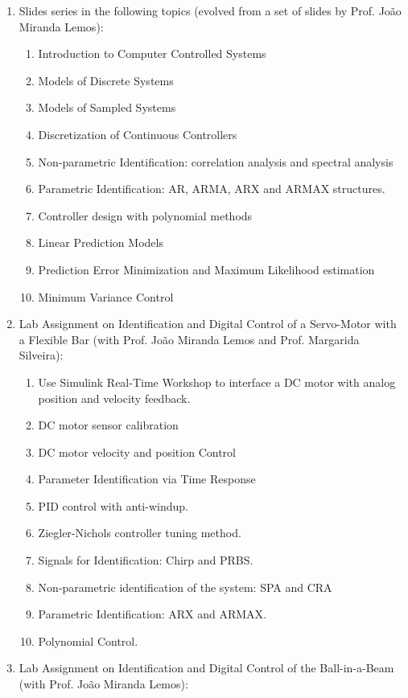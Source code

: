 \begin{enumerate}
  \begin{enumerate}
  \def\labelenumii{\alph{enumii}.}
  \item
    Slides series in the following topics (evolved from a set of slides
    by Prof. João Miranda Lemos):

    \begin{enumerate}
    \def\labelenumiii{\roman{enumiii}.}
    \item
      Introduction to Computer Controlled Systems
    \item
      Models of Discrete Systems
    \item
      Models of Sampled Systems
    \item
      Discretization of Continuous Controllers
    \item
      Non-parametric Identification: correlation analysis and spectral
      analysis
    \item
      Parametric Identification: AR, ARMA, ARX and ARMAX structures.
    \item
      Controller design with polynomial methods
    \item
      Linear Prediction Models
    \item
      Prediction Error Minimization and Maximum Likelihood estimation
    \item
      Minimum Variance Control
    \end{enumerate}
  \item
    Lab Assignment on Identification and Digital Control of a
    Servo-Motor with a Flexible Bar (with Prof. João Miranda Lemos and
    Prof. Margarida Silveira):

    \begin{enumerate}
    \def\labelenumiii{\roman{enumiii}.}
    \item
      Use Simulink Real-Time Workshop to interface a DC motor with
      analog position and velocity feedback.
    \item
      DC motor sensor calibration
    \item
      DC motor velocity and position Control
    \item
      Parameter Identification via Time Response
    \item
      PID control with anti-windup.
    \item
      Ziegler-Nichols controller tuning method.
    \item
      Signals for Identification: Chirp and PRBS.
    \item
      Non-parametric identification of the system: SPA and CRA
    \item
      Parametric Identification: ARX and ARMAX.
    \item
      Polynomial Control.
    \end{enumerate}
  \item
    Lab Assignment on Identification and Digital Control of the
    Ball-in-a-Beam (with Prof. João Miranda Lemos):


\end{enumerate}
\end{enumerate}
